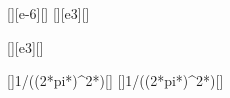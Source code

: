 [\micro\henry][e-6][\henry]
[\kilo\hertz][e3][\hertz]

[\kilo\hertz][e3][\hertz]

[]{1/((2*pi*\fzX)^2*\LrX)}[\farad]
[]{1/((2*pi*\fbX)^2*\LrX)}[\farad]
